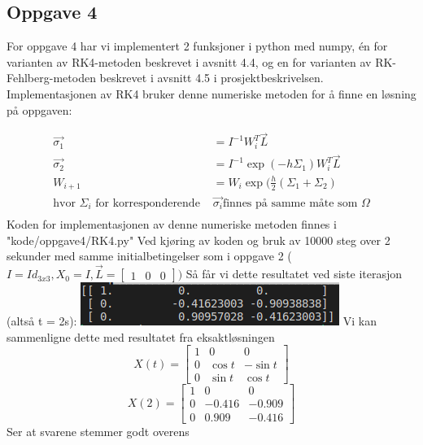 \subsection{Oppgave 4}

For oppgave 4 har vi implementert 2 funksjoner i python med numpy, én for varianten av RK4-metoden beskrevet i avsnitt 4.4, og en for varianten av RK-Fehlberg-metoden beskrevet i avsnitt 4.5 i prosjektbeskrivelsen.\newline \newline
Implementasjonen av RK4 bruker denne numeriske metoden for å finne en løsning på oppgaven: \newline

$$
\begin{aligned}
\vec{\sigma_1} &= I^{-1}W_i^T \vec{L} \\
\vec{\sigma_2} &= I^{-1}\exp{(-h\Sigma_1)}W_i^T \vec{L} \\
W_{i+1} &= W_i \exp{(\frac{h}{2}(\Sigma_1 + \Sigma_2)} \\
\text{hvor } \Sigma_i \text{ for korresponderende }& \vec{\sigma_i} \text{finnes på samme måte som } \Omega \\
\end{aligned}
$$
Koden for implementasjonen av denne numeriske metoden finnes i "kode/oppgave4/RK4.py"\newline 
Ved kjøring av koden og bruk av 10000 steg over 2 sekunder med samme initialbetingelser som i oppgave 2 ($I=Id_{3x3}, X_0 = I, \vec{L} = \begin{bmatrix} 1 & 0 & 0\end{bmatrix})$ Så får vi dette resultatet ved siste iterasjon (altså t = 2s):\newline
\includegraphics{rapport/resultat/bilder/oppg4_1.png}\newline
Vi kan sammenligne dette med resultatet fra eksaktløsningen \newline
\begin{equation}
    X(t)=\begin{bmatrix}1&0&0\\0&\cos t&-\sin t\\0&\sin t&\cos t\end{bmatrix}
\end{equation}
\begin{equation}
    X(2)=\begin{bmatrix}1&0&0\\0&-0.416&-0.909\\0&0.909&-0.416\end{bmatrix}
\end{equation} \newline Ser at svarene stemmer godt overens \newline \newline

